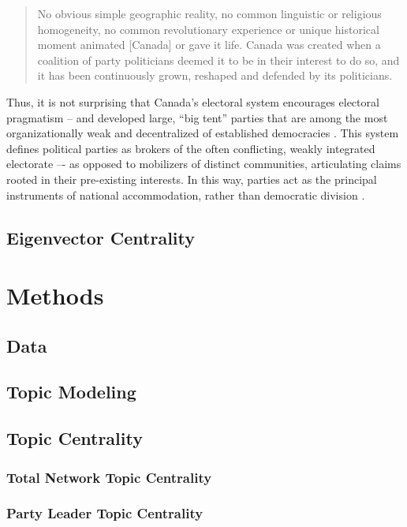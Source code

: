 \documentclass{nws}
\begin{document}
\begin{quote}
  No obvious simple geographic reality, no common linguistic or religious
  homogeneity, no common revolutionary experience or unique historical moment
  animated [Canada] or gave it life. Canada was created when a coalition of party
  politicians deemed it to be in their interest to do so, and it has been
  continuously grown, reshaped and defended by its politicians.\cite{carty2010political}
\end{quote}
  Thus, it is not surprising that Canada’s electoral system
encourages electoral pragmatism – and developed large, “big tent” parties that
are among the most organizationally weak and decentralized of established
democracies \cite{carty2010political}. This system defines political parties as brokers of the often
conflicting, weakly integrated electorate –- as opposed to mobilizers of
distinct communities, articulating claims rooted in their pre-existing
interests. In this way, parties act as the principal instruments of national
accommodation, rather than democratic division \cite{carty2010political}.


\subsection{Eigenvector Centrality}

\section{Methods}

\subsection{Data}

\subsection{Topic Modeling}

\subsection{Topic Centrality}

\subsubsection{Total Network Topic Centrality}

\subsubsection{Party Leader Topic Centrality}
\end{document}
